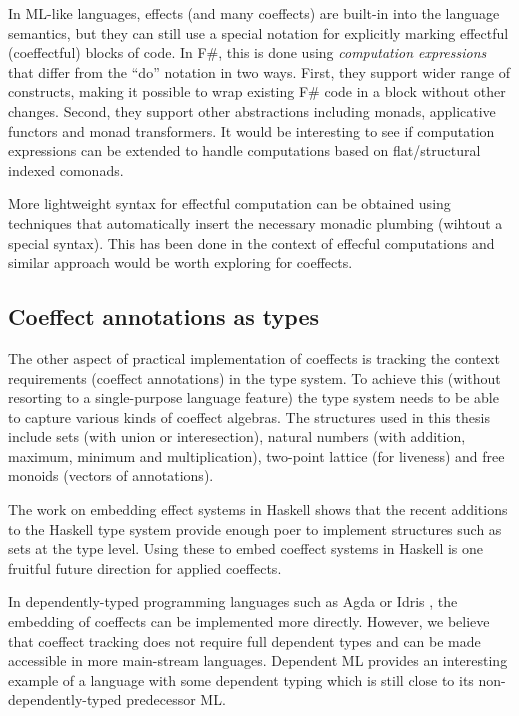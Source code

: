 In ML-like languages, effects (and many coeffects) are built-in into the language semantics, 
but they can still use a special notation for explicitly marking effectful (coeffectful) 
blocks of code. In F\#, this is done using \emph{computation expressions}  \cite{app-computation-zoo}
that differ from the ``do'' notation in two ways. First, they support wider range of 
constructs, making it possible to wrap existing F\# code in a block without other changes.
Second, they support other abstractions including monads, applicative functors and monad
transformers. It would be interesting to see if computation expressions can be extended to
handle computations based on flat/structural indexed comonads.

More lightweight syntax for effectful computation can be obtained using
techniques that automatically insert the necessary monadic plumbing (wihtout a
special syntax). This has been done in the context of effecful computations \cite{monads-lightweight-ml}
and similar approach would be worth exploring for coeffects. 


\subsection{Coeffect annotations as types}

The other aspect of practical implementation of coeffects is tracking the context requirements
(coeffect annotations) in the type system. To achieve this (without resorting to a single-purpose
language feature) the type system needs to be able to capture various kinds of coeffect algebras. 
The structures used in this thesis include sets (with union or interesection), natural numbers (with 
addition, maximum, minimum and multiplication), two-point lattice (for liveness) and free monoids 
(vectors of annotations).

The work on embedding effect systems in Haskell \cite{effects-embedding} shows that the
recent additions to the Haskell type system provide enough poer to implement structures such
as sets at the type level. Using these to embed coeffect systems in Haskell is one fruitful 
future direction for applied coeffects.  

In dependently-typed programming languages such as Agda \cite{other-agda} or Idris \cite{other-idris},
the embedding of coeffects can be implemented more directly. However, we believe that coeffect
tracking does not require full dependent types and can be made accessible in more main-stream
languages. Dependent ML \cite{types-dependent-ml} provides an interesting example of a language
with some dependent typing which is still close to its non-dependently-typed predecessor ML.


